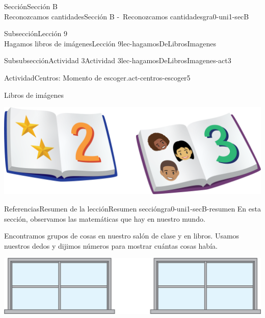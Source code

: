 \begin{sectionptx}{Sección}{{\Large Sección B\\}Reconozcamos cantidades}{}{Sección B -~Reconozcamos cantidades}{}{}{gra0-uni1-secB}
\begin{subsectionptx}{Subsección}{{\normalsize Lección 9\\[-0.05cm]}Hagamos libros de imágenes}{}{Lección 9}{}{}{lec-hagamosDeLibrosImagenes}
\begin{subsubsectionptx}{Subsubsección}{Actividad 3}{}{Actividad 3}{}{}{lec-hagamosDeLibrosImagenes-act3}
\begin{activity}{Actividad}{Centros: Momento de escoger.}{act-centros-escoger5}
\begin{sidebyside}{2}{0.025}{0.025}{0.05}
\begin{sbspanel}{0.45}
\end{sbspanel}%
\begin{sbspanel}{0.45}%
Libros de imágenes%
\par
\includegraphics[max width=\linewidth, center]{external/png-source/K.1.D Beta Student Workbooks.Books.png}
\end{sbspanel}%
\end{sidebyside}%
\end{activity}%
\end{subsubsectionptx}
\end{subsectionptx}
%
%
\typeout{************************************************}
\typeout{************************************************}
%
\begin{references-subsection}{Referencias}{Resumen de la lección}{}{Resumen sección}{}{}{gra0-uni1-secB-resumen}
En esta sección, observamos las matemáticas que hay en nuestro mundo.%
\par
Encontramos grupos de cosas en nuestro salón de clase y en libros.
 Usamos nuestros dedos y dijimos números para mostrar cuántas cosas había.%
\par
\begin{sidebyside}{2}{0.1}{0.1}{0.2}%
\begin{sbspanel}{0.5}%
\includegraphics[max width=\linewidth, center]{external/png-source/2-windows.png}
\end{sbspanel}%
\begin{sbspanel}{0.1}%

\end{sbspanel}
\end{sidebyside}
\end{references-subsection}
\end{sectionptx}
